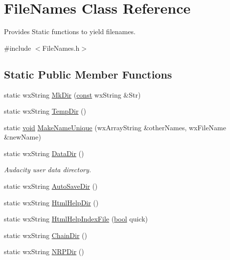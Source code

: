 \hypertarget{class_file_names}{}\section{File\+Names Class Reference}
\label{class_file_names}


Provides Static functions to yield filenames.  




{\ttfamily \#include $<$File\+Names.\+h$>$}

\subsection*{Static Public Member Functions}
\begin{DoxyCompactItemize}
\item 
static wx\+String \hyperlink{class_file_names_a9f9f44a1857aa1e37de31515b41352ef}{Mk\+Dir} (\hyperlink{getopt1_8c_a2c212835823e3c54a8ab6d95c652660e}{const} wx\+String \&Str)
\item 
static wx\+String \hyperlink{class_file_names_a703e46fe9ac21e11b497d08f3856400c}{Temp\+Dir} ()
\item 
static \hyperlink{sound_8c_ae35f5844602719cf66324f4de2a658b3}{void} \hyperlink{class_file_names_a6194a25e0a03d8f91f564d2671aaa674}{Make\+Name\+Unique} (wx\+Array\+String \&other\+Names, wx\+File\+Name \&new\+Name)
\item 
static wx\+String \hyperlink{class_file_names_a6bf904497b02ca522212443c42945a47}{Data\+Dir} ()
\begin{DoxyCompactList}\small\item\em Audacity user data directory. \end{DoxyCompactList}\item 
static wx\+String \hyperlink{class_file_names_aac977f49c953fa055c4795f3fe4fc13d}{Auto\+Save\+Dir} ()
\item 
static wx\+String \hyperlink{class_file_names_a3615a7fd3ef470c05394bb05fde04a72}{Html\+Help\+Dir} ()
\item 
static wx\+String \hyperlink{class_file_names_ad4c10f54f633e0f2b85c40ed95aa1f8b}{Html\+Help\+Index\+File} (\hyperlink{mac_2config_2i386_2lib-src_2libsoxr_2soxr-config_8h_abb452686968e48b67397da5f97445f5b}{bool} quick)
\item 
static wx\+String \hyperlink{class_file_names_ac9a7a458bffa8f65ce95bffdef1b8647}{Chain\+Dir} ()
\item 
static wx\+String \hyperlink{class_file_names_ad39162bdbf5a989cf38d4b8b0b83f588}{N\+R\+P\+Dir} ()

\end{DoxyCompactItemize}
